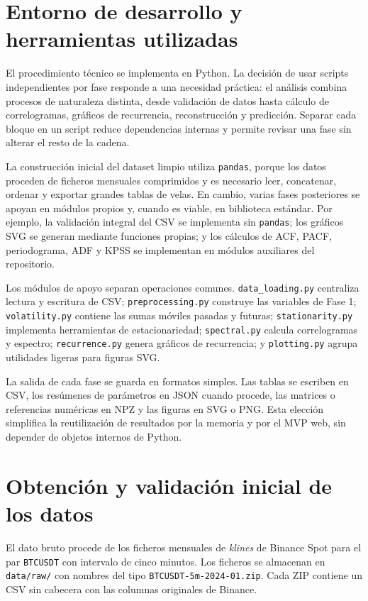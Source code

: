 \section{Entorno de desarrollo y herramientas utilizadas}\label{sec:entorno-desarrollo}

El procedimiento técnico se implementa en Python. La decisión de usar scripts independientes por fase responde a una necesidad práctica: el análisis combina procesos de naturaleza distinta, desde validación de datos hasta cálculo de correlogramas, gráficos de recurrencia, reconstrucción y predicción. Separar cada bloque en un script reduce dependencias internas y permite revisar una fase sin alterar el resto de la cadena.

La construcción inicial del dataset limpio utiliza \texttt{pandas}, porque los datos proceden de ficheros mensuales comprimidos y es necesario leer, concatenar, ordenar y exportar grandes tablas de velas. En cambio, varias fases posteriores se apoyan en módulos propios y, cuando es viable, en biblioteca estándar. Por ejemplo, la validación integral del CSV se implementa sin \texttt{pandas}; los gráficos SVG se generan mediante funciones propias; y los cálculos de ACF, PACF, periodograma, ADF y KPSS se implementan en módulos auxiliares del repositorio.

Los módulos de apoyo separan operaciones comunes. \texttt{data\_\allowbreak loading.py} centraliza lectura y escritura de CSV; \texttt{preprocessing.py} construye las variables de Fase 1; \texttt{volatility.py} contiene las sumas móviles pasadas y futuras; \texttt{stationarity.py} implementa herramientas de estacionariedad; \texttt{spectral.py} calcula correlogramas y espectro; \texttt{recurrence.py} genera gráficos de recurrencia; y \texttt{plotting.py} agrupa utilidades ligeras para figuras SVG.

La salida de cada fase se guarda en formatos simples. Las tablas se escriben en CSV, los resúmenes de parámetros en JSON cuando procede, las matrices o referencias numéricas en NPZ y las figuras en SVG o PNG. Esta elección simplifica la reutilización de resultados por la memoria y por el MVP web, sin depender de objetos internos de Python.

\section{Obtención y validación inicial de los datos}\label{sec:obtencion-datos}

El dato bruto procede de los ficheros mensuales de \textit{klines} de Binance Spot para el par \texttt{BTCUSDT} con intervalo de cinco minutos. Los ficheros se almacenan en \texttt{data/\allowbreak raw/} con nombres del tipo \texttt{BTCUSDT-5m-2024-01.zip}. Cada ZIP contiene un CSV sin cabecera con las columnas originales de Binance.

